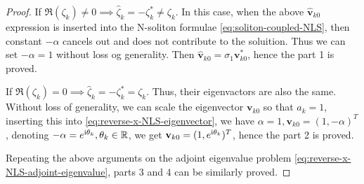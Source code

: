 \begin{proof}
    If $\Re(\zeta_{k}) \neq 0 \implies \hat{\zeta}_{k} = -\zeta^{*}_{k} \neq \zeta_{k} $. In this case, when the above $ \hat{\mathbf{v}}_{k0} $ expression is inserted into the N-soliton formulae \eqref{eq:soliton-coupled-NLS}, then constant $ -\alpha $ cancels out and does not contribute to the soluition. Thus we can set $ -\alpha = 1 $ without loss og generality. Then $ \hat{\mathbf{v}}_{k0} = \sigma_{1}\mathbf{v}_{k0}^{*} $, hence the part 1 is proved.
    
    If $\Re(\zeta_{k}) = 0 \implies \hat{\zeta}_{k} = -\zeta^{*}_{k} = \zeta_{k} $. Thus, their eigenvactors are also the same. Without loss of generality, we can scale the eigenvector $ \mathbf{v}_{k0} $ so that $ a_{k} = 1 $, inserting this into \eqref{eq:reverse-x-NLS-eigenvector}, we have $ \alpha = 1, \mathbf{v}_{k0} = (1, -\alpha)^{T}$, denoting $ -\alpha = e^{\mathrm{i} \theta_{k}}, \theta_{k} \in \mathbb{R}$, we get $ \mathbf{v}_{k0} = (1, e^{\mathrm{i} \theta_{k}})^{T} $, hence the part 2 is proved.

    Repeating the above arguments on the adjoint eigenvalue problem \eqref{eq:reverse-x-NLS-adjoint-eigenvalue}, parts 3 and 4 can be similarly proved.
\end{proof}

